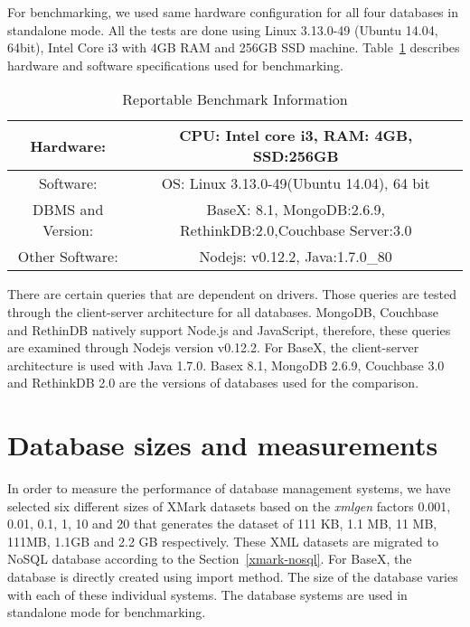 For benchmarking, we used same hardware configuration for all four databases in standalone mode. All the tests are done using  Linux 3.13.0-49 (Ubuntu 14.04, 64bit), Intel Core i3 with 4GB RAM and 256GB SSD machine.
Table~\ref{benchmark-configuration-table} describes hardware and software specifications used for benchmarking. 
\begin{table}[h]	
	\centering
	\caption{Reportable Benchmark Information}
	\begin{tabular}{|c|c|c|c} 
		\hline
		Hardware: & \multicolumn{3}{|c|}{CPU: Intel core i3, RAM: 4GB, SSD:256GB  } \\
		\hline
		Software: & \multicolumn{3}{|c|}{OS: Linux 3.13.0-49(Ubuntu 14.04), 64 bit} \\
		\hline
		DBMS and Version: & \multicolumn{3}{|c|}{ BaseX: 8.1, MongoDB:2.6.9, RethinkDB:2.0,Couchbase Server:3.0 } \\
		\hline
		Other Software: & \multicolumn{3}{|c|}{Nodejs: v0.12.2, Java:1.7.0\_80 } \\
		\hline
	\end{tabular}	
	\label{benchmark-configuration-table}
\end{table}
There are certain queries that are dependent on drivers. Those queries are tested through the client-server architecture for all databases. MongoDB, Couchbase and RethinDB natively support Node.js and JavaScript, therefore, these queries are examined through Nodejs version  v0.12.2. For BaseX, the client-server architecture is used with Java 1.7.0. Basex 8.1, MongoDB 2.6.9, Couchbase 3.0 and RethinkDB 2.0 are the versions of databases used for the comparison. 
\par
\section{Database sizes and measurements}\label{benchmark-database-size}
In order to measure the performance of database management systems, we have selected six different sizes of XMark datasets based on the \textit{xmlgen} factors 0.001, 0.01, 0.1, 1, 10 and 20 that generates the dataset of 111 KB, 1.1 MB, 11 MB, 111MB, 1.1GB and 2.2 GB respectively. These XML datasets are migrated to NoSQL database according to the Section~\ref{xmark-nosql}. For BaseX, the database is directly created using import method. The size of the database varies with each of these individual systems. The database systems are used in standalone mode for benchmarking.